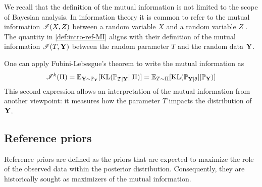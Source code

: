 
We recall that the definition of the mutual information is not limited to the scope of Bayesian analysis. In information theory it is common to refer to the mutual information $\mathscr{I}(X,Z)$ between a random variable $X$ and a random variable $Z$ \citep{mackay_information_2003}. The quantity in \cref{def:intro-ref-MI} aligns with their definition of the mutual information $\mathscr{I}(T,\mathbf{Y})$ between the random parameter $T$ and the random data $\mathbf{Y}$.

One can apply Fubini-Lebesgue's theorem to write the mutual information as
\begin{equation}
    \mathscr{I}^k(\Pi) =  \mathbb{E}_{\mathbf{Y}\sim \mathbb{P}_{\mathbf{Y}}}[\text{KL}(\mathbb{P}_{T|\mathbf{Y}}||\Pi)] =  \mathbb{E}_{T\sim\Pi}[\text{KL}(\mathbb{P}_{\mathbf{Y}|\theta}||\mathbb{P}_{\mathbf{Y}}) ]
\end{equation}
This second expression allows an interpretation of the mutual information from another viewpoint: it measures how the parameter $T$ impacts the distribution of $\mathbf{Y}$.










\subsection{Reference priors}\label{sec:intro-ref:refpriors}

Reference priors are defined as the priors that are expected to maximize the role of the observed data within the posterior distribution.
Consequently, they are historically sought as maximizers of the mutual information.

